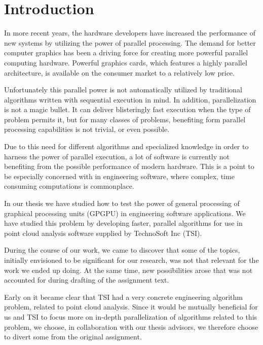 \chapter{Introduction}

In more recent years, the hardware developers have increased the performance of new systems by utilizing the power of parallel processing. The demand for better computer graphics has been a driving force for creating more powerful parallel computing hardware. Powerful graphics cards, which features a highly parallel architecture, is available on the consumer market to a relatively low price.

Unfortunately this parallel power is not automatically utilized by traditional algorithms written with sequential execution in mind. In addition, parallelization is not a magic bullet. It can deliver blisteringly fast execution when the type of problem permits it, but for many classes of problems, benefiting form parallel processing capabilities is not trivial, or even possible.

Due to this need for different algorithms and specialized knowledge in order to harness the power of parallel execution, a lot of software is currently not benefiting from the possible performance of modern hardware. This is a point to be especially concerned with in engineering software, where complex, time consuming computations is commonplace.

In our thesis we have studied how to test the power of general processing of graphical processing units (GPGPU) in engineering software applications. We have studied this problem by developing faster, parallel algorithms for use in point cloud analysis software supplied by TechnoSoft Inc (TSI).

During the course of our work, we came to discover that some of the topics, initially envisioned to be significant for our research, was not that relevant for the work we ended up doing. At the same time, new possibilities arose that was not accounted for during drafting of the assignment text. 

Early on it became clear that TSI had a very concrete engineering algorithm problem, related to point cloud analysis. Since it would be mutually beneficial for us and TSI to focus more on in-depth parallelization of algorithms related to this problem, we choose, in collaboration with our thesis advisors, we therefore choose to divert some from the original assignment.

